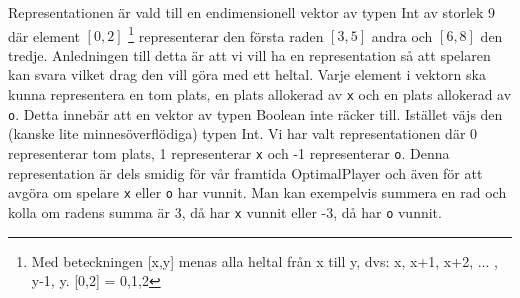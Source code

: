Representationen är vald till en endimensionell vektor av typen Int av storlek 9 där element $[0,2]$ \footnote{Med beteckningen [x,y] menas alla heltal från x till y, dvs: x, x+1, x+2, ... , y-1, y. [0,2] = {0,1,2}} representerar den första raden $[3,5]$ andra och $[6,8]$ den tredje. Anledningen till detta är att vi vill ha en representation så att spelaren kan svara vilket drag den vill göra med ett heltal.
Varje element i vektorn ska kunna representera en tom plats, en plats allokerad av \texttt{x} och en plats allokerad av \texttt{o}. Detta innebär att en vektor av typen Boolean inte räcker till. Istället väjs den (kanske lite minnesöverflödiga) typen Int. Vi har valt representationen där 0 representerar tom plats, 1 representerar \texttt{x} och -1 representerar \texttt{o}. Denna representation är dels smidig för vår framtida OptimalPlayer och även för att avgöra om spelare \texttt{x} eller \texttt{o} har vunnit. Man kan exempelvis summera en rad och kolla om radens summa är 3, då har \texttt{x} vunnit eller -3, då har \texttt{o} vunnit.

